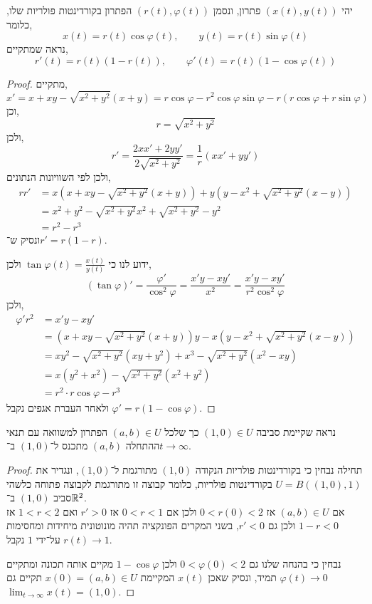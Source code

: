 \subquestion{}
יהי $(x(t), y(t))$ פתרון, ונסמן $(r(t), \varphi(t))$ הפתרון בקורדינטות פולריות שלו, כלומר,
\[
	x(t) = r(t) \cos \varphi(t),
	\qquad
	y(t) = r(t) \sin \varphi(t)
\]
נראה שמתקיים,
\[
	r'(t)
	= r(t) (1 - r(t)),
	\qquad
	\varphi'(t)
	= r(t) (1 - \cos \varphi(t))
\]
\begin{proof}
	מתקיים,
	\[
		x'
		= x + xy - \sqrt{x^2 + y^2} (x + y)
		= r \cos \varphi - r^2 \cos \varphi \sin \varphi - r (r \cos \varphi + r \sin \varphi)
	\]
	וכן,
	\[
		r = \sqrt{x^2 + y^2}
	\]
	ולכן,
	\[
		r'
		= \frac{2x x' + 2y y'}{2 \sqrt{x^2 + y^2}}
		= \frac{1}{r} (x x' + y y')
	\]
	ולכן לפי השוויונות הנתונים,
	\begin{align*}
		r r'
		& = x(x + xy - \sqrt{x^2 + y^2} (x + y)) + y(y - x^2 + \sqrt{x^2 + y^2} (x - y)) \\
		& = x^2 + y^2 - \sqrt{x^2 + y^2} x^2 + \sqrt{x^2 + y^2} - y^2 \\
		& = r^2 - r^3
	\end{align*}
	ונסיק ש־$r' = r (1 - r)$.

	ידוע לנו כי $\tan \varphi(t) = \frac{x(t)}{y(t)}$ ולכן,
	\[
		(\tan \varphi)'
		= \frac{\varphi'}{\cos^2 \varphi}
		= \frac{x' y - x y'}{x^2}
		= \frac{x' y - x y'}{r^2 \cos^2 \varphi}
	\]
	ולכן,
	\begin{align*}
		\varphi' r^2
		& = x' y - x y' \\
		& = (x + xy - \sqrt{x^2 + y^2} (x + y)) y - x (y - x^2 + \sqrt{x^2 + y^2} (x - y)) \\
		& = x y^2 - \sqrt{x^2 + y^2} (xy + y^2) + x^3 - \sqrt{x^2 + y^2} (x^2 - xy) \\
		& = x (y^2 + x^2) - \sqrt{x^2 + y^2} (x^2 + y^2) \\
		& = r^2 \cdot r \cos \varphi - r^3
	\end{align*}
	ולאחר העברת אגפים נקבל $\varphi' = r (1 - \cos \varphi)$.
\end{proof}

\subquestion{}
נראה שקיימת סביבה $(1, 0) \in U$ כך שלכל $(a, b) \in U$ הפתרון למשוואה עם תנאי ההתחלה $(a, b)$ מתכנס ל־$(1, 0)$ ב־$t \to \infty$.
\begin{proof}
	תחילה נבחין כי בקורדינטות פולריות הנקודה $(1, 0)$ מתורגמת ל־$(1, 0)$, ונגדיר את $U = B((1, 0), 1)$ בקורדינטות פולריות, כלומר קבוצה זו מתורגמת לקבוצה פתוחה כלשהי סביב $(1, 0)$ ב־$\mathbb{R}^2$. \\
	אם $(a, b) \in U$ אז $0 < r(0) < 2$ ולכן אם $0 < r < 1$ אז $r' > 0$ ואם $1 < r < 2$ אז $1 - r < 0$ ולכן גם $r' < 0$, בשני המקרים הפונקציה תהיה מונוטונית מיחידות ומחסימות על־ידי $1$ נקבל $r(t) \to 1$.

	נבחין כי בהנחה שלנו גם $0 < \varphi(0) < 2$ ולכן $1 - \cos \varphi$ מקיים אותה תכונה ומתקיים $\varphi(t) \to 0$ תמיד, ונסיק שאכן $x(t)$ המקיימת $x(0) = (a, b) \in U$ תקיים גם $\lim_{t \to \infty} x(t) = (1, 0)$.
\end{proof}

